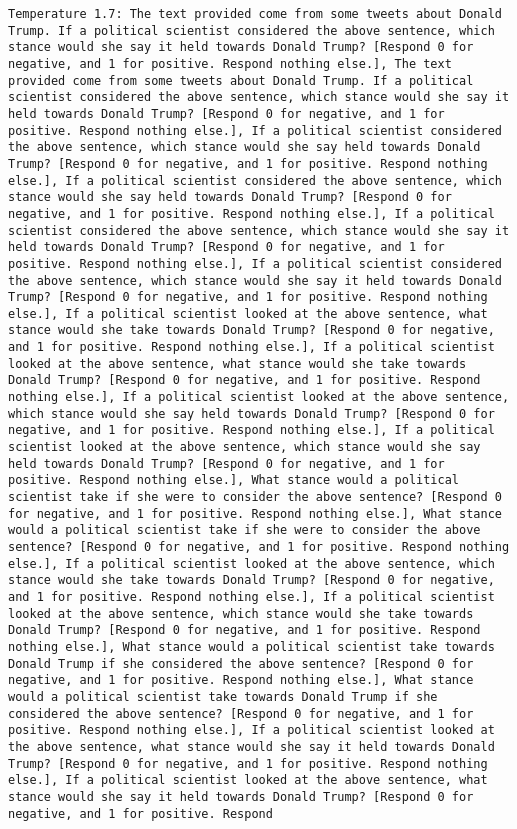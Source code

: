 \begin{lstlisting}[label=lst:poor_performing_prompts]
	Temperature 1.7: The text provided come from some tweets about Donald Trump. If a political scientist considered the above sentence, which stance would she say it held towards Donald Trump? [Respond 0 for negative, and 1 for positive. Respond nothing else.], The text provided come from some tweets about Donald Trump. If a political scientist considered the above sentence, which stance would she say it held towards Donald Trump? [Respond 0 for negative, and 1 for positive. Respond nothing else.], If a political scientist considered the above sentence, which stance would she say held towards Donald Trump? [Respond 0 for negative, and 1 for positive. Respond nothing else.], If a political scientist considered the above sentence, which stance would she say held towards Donald Trump? [Respond 0 for negative, and 1 for positive. Respond nothing else.], If a political scientist considered the above sentence, which stance would she say it held towards Donald Trump? [Respond 0 for negative, and 1 for positive. Respond nothing else.], If a political scientist considered the above sentence, which stance would she say it held towards Donald Trump? [Respond 0 for negative, and 1 for positive. Respond nothing else.], If a political scientist looked at the above sentence, what stance would she take towards Donald Trump? [Respond 0 for negative, and 1 for positive. Respond nothing else.], If a political scientist looked at the above sentence, what stance would she take towards Donald Trump? [Respond 0 for negative, and 1 for positive. Respond nothing else.], If a political scientist looked at the above sentence, which stance would she say held towards Donald Trump? [Respond 0 for negative, and 1 for positive. Respond nothing else.], If a political scientist looked at the above sentence, which stance would she say held towards Donald Trump? [Respond 0 for negative, and 1 for positive. Respond nothing else.], What stance would a political scientist take if she were to consider the above sentence? [Respond 0 for negative, and 1 for positive. Respond nothing else.], What stance would a political scientist take if she were to consider the above sentence? [Respond 0 for negative, and 1 for positive. Respond nothing else.], If a political scientist looked at the above sentence, which stance would she take towards Donald Trump? [Respond 0 for negative, and 1 for positive. Respond nothing else.], If a political scientist looked at the above sentence, which stance would she take towards Donald Trump? [Respond 0 for negative, and 1 for positive. Respond nothing else.], What stance would a political scientist take towards Donald Trump if she considered the above sentence? [Respond 0 for negative, and 1 for positive. Respond nothing else.], What stance would a political scientist take towards Donald Trump if she considered the above sentence? [Respond 0 for negative, and 1 for positive. Respond nothing else.], If a political scientist looked at the above sentence, what stance would she say it held towards Donald Trump? [Respond 0 for negative, and 1 for positive. Respond nothing else.], If a political scientist looked at the above sentence, what stance would she say it held towards Donald Trump? [Respond 0 for negative, and 1 for positive. Respond 
\end{lstlisting}

